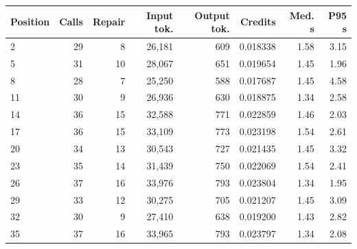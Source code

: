 \begin{tabular}{lrrrrrrr}
\toprule
Position & Calls & Repair & Input tok. & Output tok. & Credits & Med. s & P95 s \\
\midrule
2 & 29 & 8 & 26,181 & 609 & 0.018338 & 1.58 & 3.15 \\
5 & 31 & 10 & 28,067 & 651 & 0.019654 & 1.45 & 1.96 \\
8 & 28 & 7 & 25,250 & 588 & 0.017687 & 1.45 & 4.58 \\
11 & 30 & 9 & 26,936 & 630 & 0.018875 & 1.34 & 2.58 \\
14 & 36 & 15 & 32,588 & 771 & 0.022859 & 1.46 & 2.03 \\
17 & 36 & 15 & 33,109 & 773 & 0.023198 & 1.54 & 2.61 \\
20 & 34 & 13 & 30,543 & 727 & 0.021435 & 1.45 & 3.32 \\
23 & 35 & 14 & 31,439 & 750 & 0.022069 & 1.54 & 2.41 \\
26 & 37 & 16 & 33,976 & 793 & 0.023804 & 1.34 & 1.95 \\
29 & 33 & 12 & 30,275 & 705 & 0.021207 & 1.45 & 3.09 \\
32 & 30 & 9 & 27,410 & 638 & 0.019200 & 1.43 & 2.82 \\
35 & 37 & 16 & 33,965 & 793 & 0.023797 & 1.34 & 2.08 \\
\bottomrule
\end{tabular}
